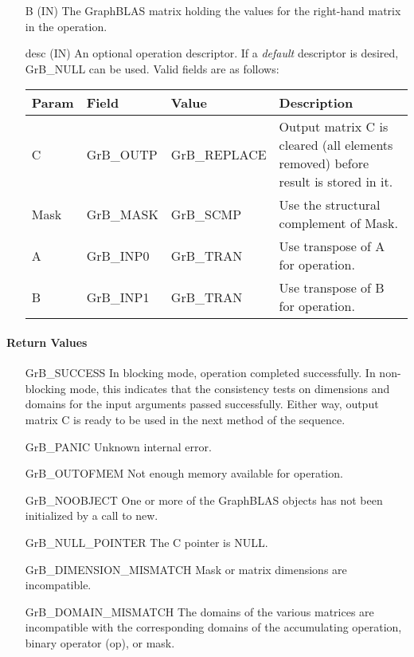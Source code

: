 \begin{itemize}[leftmargin=1.1in]
    \item[{\sf B}]     ({\sf IN}) The GraphBLAS matrix holding the values for
    the right-hand matrix in the operation.
    
    \item[{\sf desc}]  ({\sf IN}) An optional operation descriptor.  If a \emph{default}
    descriptor is desired, {\sf GrB\_NULL} can be used.  Valid fields are
    as follows: \\
    
    \begin{tabular}{lllp{2.5in}}
        Param & Field  & Value & Description \\
        \hline
        {\sf C}    & {\sf GrB\_OUTP} & {\sf GrB\_REPLACE} & Output matrix {\sf C} is cleared (all elements removed) before result is stored in it.\\
        {\sf Mask} & {\sf GrB\_MASK} & {\sf GrB\_SCMP}   & Use the structural complement of {\sf Mask}. \\
        {\sf A}    & {\sf GrB\_INP0} & {\sf GrB\_TRAN}   & Use transpose of {\sf A} for operation. \\
        {\sf B}    & {\sf GrB\_INP1} & {\sf GrB\_TRAN}   & Use transpose of {\sf B} for operation. \\
    \end{tabular}
\end{itemize}

\paragraph{Return Values}

\begin{itemize}[leftmargin=2.1in]
    \item[{\sf GrB\_SUCCESS}]         In blocking mode, operation
	completed successfully. In non-blocking mode, this indicates
	that the consistency tests on dimensions and domains for the
	input arguments passed successfully. Either way, output matrix
	{\sf C} is ready to be used in the next method of the sequence.

    \item[{\sf GrB\_PANIC}]           Unknown internal error.
    
    \item[{\sf GrB\_OUTOFMEM}]        Not enough memory available for operation.
    
    \item[{\sf GrB\_NOOBJECT}]        One or more of the GraphBLAS objects has
    not been initialized by a call to {\sf new}.
    
    \item[{\sf GrB\_NULL\_POINTER}]  The {\sf C} pointer is {\sf NULL}.

    \item[{\sf GrB\_DIMENSION\_MISMATCH}] Mask or matrix dimensions are incompatible.

	\item[{\sf GrB\_DOMAIN\_MISMATCH}]    The domains of the various
	matrices are incompatible with the corresponding domains of the
	accumulating operation, binary operator ({\sf op}), or mask.
\end{itemize}

